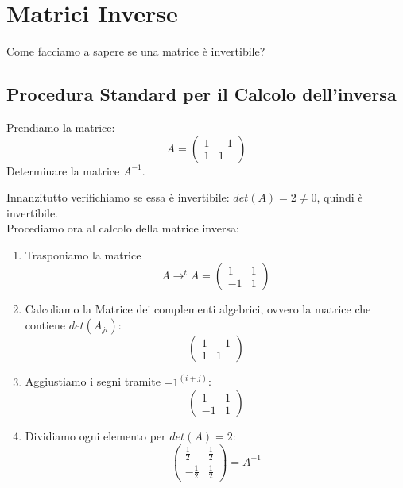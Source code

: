 \section{Matrici Inverse}
Come facciamo a sapere se una matrice è invertibile?

\subsection*{Procedura Standard per il Calcolo dell'inversa}
Prendiamo la matrice:
\[
	A = \begin{pmatrix}
		1 & -1 \\ 1 & 1
	\end{pmatrix}
\]
Determinare la matrice $A^{-1}$.

Innanzitutto verifichiamo se essa è invertibile: $det(A)=2\neq 0$, quindi è invertibile.
\\Procediamo ora al calcolo della matrice inversa:
\begin{enumerate}
	\item Trasponiamo la matrice
	\[A \to ^tA = \begin{pmatrix} 1 & 1 \\ -1 & 1 \end{pmatrix}\]
	\item Calcoliamo la Matrice dei complementi algebrici, ovvero la matrice che contiene $det(A_{ji})$:
	\[ \begin{pmatrix} 1 & -1 \\ 1 & 1 \end{pmatrix}\]
	\item Aggiustiamo i segni tramite $-1^{(i+j)}$: \[ \begin{pmatrix} 1 & 1 \\ -1 & 1 \end{pmatrix}\]
	\item Dividiamo ogni elemento per $det(A)=2$:
	\[\begin{pmatrix}
		\frac{1}{2} & \frac{1}{2} \\ -\frac{1}{2} & \frac{1}{2}
	\end{pmatrix} = A^{-1}
	\] 
\end{enumerate} 


